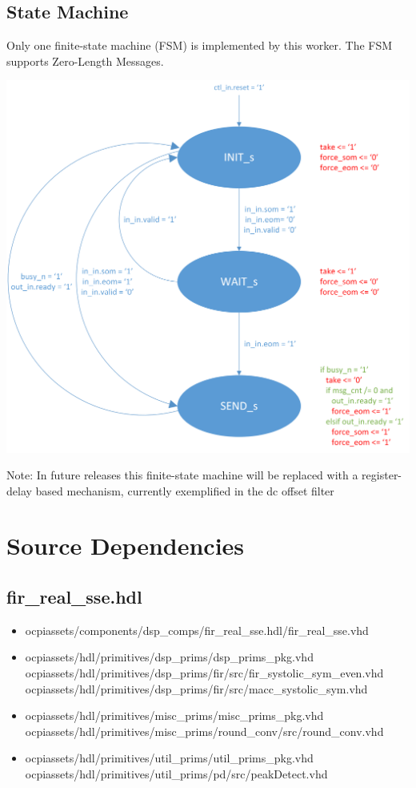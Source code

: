 \documentclass{article}
\def\comp{fir\_real\_sse}
\begin{document}
\subsection*{State Machine}
\begin{flushleft}
	Only one finite-state machine (FSM) is implemented by this worker. The FSM supports Zero-Length Messages.
\end{flushleft}
{\centering\captionsetup{type=figure}\includegraphics[scale=0.7]{zlm_fsm}\par{}\label{fig:zlm_fsm}}
\begin{flushleft}
        Note: In future releases this finite-state machine will be replaced with a register-delay based mechanism, currently exemplified in the dc offset filter
\end{flushleft}

\newpage

\section*{Source Dependencies}
\subsection*{\comp.hdl}
\begin{itemize}
	\item ocpiassets/components/dsp\_comps/fir\_real\_sse.hdl/fir\_real\_sse.vhd
	\item ocpiassets/hdl/primitives/dsp\_prims/dsp\_prims\_pkg.vhd
	      \subitem ocpiassets/hdl/primitives/dsp\_prims/fir/src/fir\_systolic\_sym\_even.vhd
	      \subitem ocpiassets/hdl/primitives/dsp\_prims/fir/src/macc\_systolic\_sym.vhd
	\item ocpiassets/hdl/primitives/misc\_prims/misc\_prims\_pkg.vhd
	      \subitem ocpiassets/hdl/primitives/misc\_prims/round\_conv/src/round\_conv.vhd
	\item ocpiassets/hdl/primitives/util\_prims/util\_prims\_pkg.vhd
	      \subitem ocpiassets/hdl/primitives/util\_prims/pd/src/peakDetect.vhd
\end{itemize}
\end{document}
